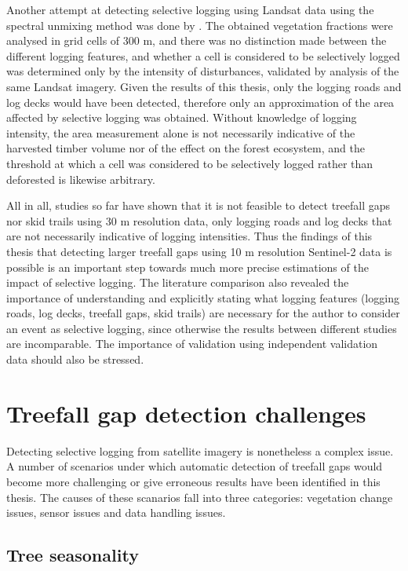 \documentclass[a4paper,12pt]{scrbook}
\begin{document}
Another attempt at detecting selective logging using Landsat data using the spectral unmixing method was done by \citet{grecchi_integrated_2017}. The obtained vegetation fractions were analysed in grid cells of 300 m, and there was no distinction made between the different logging features, and whether a cell is considered to be selectively logged was determined only by the intensity of disturbances, validated by analysis of the same Landsat imagery. Given the results of this thesis, only the logging roads and log decks would have been detected, therefore only an approximation of the area affected by selective logging was obtained. Without knowledge of logging intensity, the area measurement alone is not necessarily indicative of the harvested timber volume nor of the effect on the forest ecosystem, and the threshold at which a cell was considered to be selectively logged rather than deforested is likewise arbitrary.

All in all, studies so far have shown that it is not feasible to detect treefall gaps nor skid trails using 30 m resolution data, only logging roads and log decks that are not necessarily indicative of logging intensities. Thus the findings of this thesis that detecting larger treefall gaps using 10 m resolution Sentinel-2 data is possible is an important step towards much more precise estimations of the impact of selective logging. The literature comparison also revealed the importance of understanding and explicitly stating what logging features (logging roads, log decks, treefall gaps, skid trails) are necessary for the author to consider an event as selective logging, since otherwise the results between different studies are incomparable. The importance of validation using independent validation data should also be stressed.

\section{Treefall gap detection challenges}

Detecting selective logging from satellite imagery is nonetheless a complex issue. A number of scenarios under which automatic detection of treefall gaps would become more challenging or give erroneous results have been identified in this thesis. The causes of these scanarios fall into three categories: vegetation change issues, sensor issues and data handling issues.

\subsection{Tree seasonality}
\end{document}

